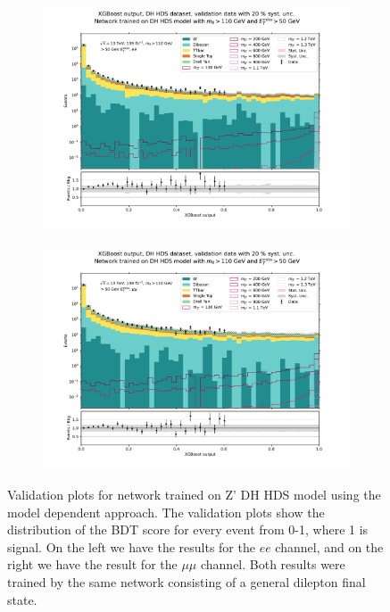 \documentclass[12pt, a4paper]{book}
\begin{document}
\begin{figure}[!ht]
	\centering
	\begin{subfigure}[b]{0.49\textwidth}
      \centering
      \includegraphics[width=1\textwidth]{XGBoost/DH_HDS/VAL_ee.pdf}
      \end{subfigure}
   \hfill
   \begin{subfigure}[b]{0.49\textwidth}
      \centering
      \includegraphics[width=1\textwidth]{XGBoost/DH_HDS/VAL_uu.pdf}
      \end{subfigure}
   \caption[Validation plots for network trained on Z' DH HDS model using the model dependent approach. ]{Validation plots for network trained on Z' DH HDS model using the model dependent approach. The validation plots show the distribution of the BDT score for every event from 0-1, where 1 is signal. On the left we have the results for the $ee$ channel, and on the right we have the result for the $\mu\mu$ channel. Both results were 
   trained by the same network consisting of a general dilepton final state.}\label{fig:DH_HDS_vals}
\end{figure}
\end{document}
